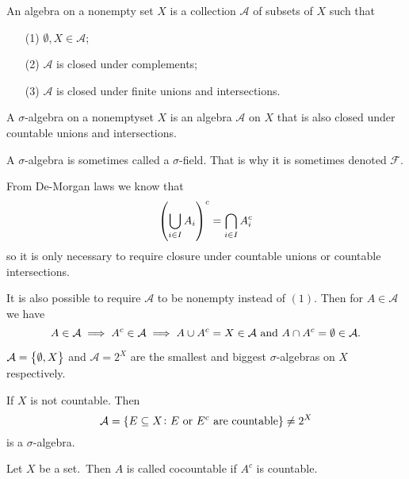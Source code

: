\documentclass[11pt,a4paper]{article}
\newcommand{\A}{\mathcal A}
\begin{document}
\begin{definition}[Algebra]
  An algebra on a nonempty set $X$ is a collection $\mathcal A$ of
  subsets of $X$ such that
  \begin{enumerate}
    \item[(1)] $\emptyset, X \in \mathcal A$;
    \item[(2)] $\mathcal A$ is closed under complements;
    \item[(3)] $\mathcal A$ is closed under finite unions and intersections.
  \end{enumerate}
\end{definition}

\begin{definition}
  A $\sigma$-algebra on a nonemptyset $X$ is an algebra $\mathcal A$ on
  $X$ that is also closed under countable unions and intersections.
\end{definition}

\begin{remark}
  A $\sigma$-algebra is sometimes called a $\sigma$-field.
  That is why it is sometimes denoted $\mathcal F$.
\end{remark}

\begin{remark}
  From De-Morgan laws we know that
  \[
    \del{\bigcup_{i \in I} A_i}^c =
    \bigcap_{i \in I} A_i^c
  \]
  so it is only necessary to require closure under countable unions
  or countable intersections.
\end{remark}

\begin{remark}
  It is also possible to require $\mathcal A$ to be nonempty instead of 
  $(1)$.
  Then for $A \in \mathcal A$ we have
  \[
    A \in \A \implies A^c \in \A \implies
    A \cup A^c = X \in \A \stand
    A \cap A^c = \emptyset \in \A.
  \]
\end{remark}

\begin{example}
  $\A = \set{\emptyset, X}$ and $\A = 2^X$ are the smallest
  and biggest $\sigma$-algebras on $X$ respectively.
\end{example}

\begin{example}
  If $X$ is not countable.
  Then
  \[
    \mathcal A =
    \set{E \subseteq X \colon E \text{ or }E^c \text{ are countable}} \neq
    2^X
  \]
  is a $\sigma$-algebra.
\end{example}

\begin{definition}[Cocountablility]
  Let $X$ be a set.\ Then $A$ is called cocountable if $A^c$ is countable.
\end{definition}
\end{document}
